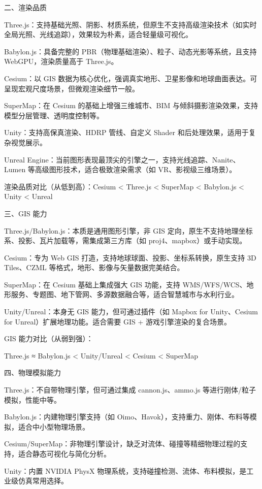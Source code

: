 二、渲染品质

Three.js：支持基础光照、阴影、材质系统，但原生不支持高级渲染技术（如实时全局光照、光线追踪），效果较为朴素，适合轻量级可视化。

Babylon.js：具备完整的 PBR（物理基础渲染）、粒子、动态光影等系统，且支持 WebGPU，渲染质量高于 Three.js。

Cesium：以 GIS 数据为核心优化，强调真实地形、卫星影像和地球曲面表达。可呈现宏观尺度场景，但微观渲染细节一般。

SuperMap：在 Cesium 的基础上增强三维城市、BIM 与倾斜摄影渲染效果，支持模型分层管理、透明度控制等。

Unity：支持高保真渲染、HDRP 管线、自定义 Shader 和后处理效果，适用于复杂视觉展示。

Unreal Engine：当前图形表现最顶尖的引擎之一，支持光线追踪、Nanite、Lumen 等高级图形技术，适合极致渲染需求（如 VR、影视级三维场景）。

渲染品质对比（从低到高）：Cesium \textless{} Three.js \textless{} SuperMap \textless{} Babylon.js \textless{} Unity \textless{} Unreal

三、GIS 能力

Three.js/Babylon.js：本质是通用图形引擎，非 GIS 定向，原生不支持地理坐标系、投影、瓦片加载等，需集成第三方库（如 proj4、mapbox）或手动实现。

Cesium：专为 Web GIS 打造，支持地球球面、投影、坐标系转换，原生支持 3D Tiles、CZML 等格式，地形、影像与矢量数据完美结合。

SuperMap：在 Cesium 基础上集成强大 GIS 功能，支持 WMS/WFS/WCS、地形服务、专题图、地下管网、多源数据融合等，适合智慧城市与水利行业。

Unity/Unreal：本身无 GIS 能力，但可通过插件（如 Mapbox for Unity、Cesium for Unreal）扩展地理功能。适合需要 GIS + 游戏引擎渲染的复合场景。

GIS 能力对比（从弱到强）：

Three.js ≈ Babylon.js \textless{} Unity/Unreal \textless{} Cesium \textless{} SuperMap

四、物理模拟能力

Three.js：不自带物理引擎，但可通过集成 cannon.js、ammo.js 等进行刚体/粒子模拟，性能中等。

Babylon.js：内建物理引擎支持（如 Oimo、Havok），支持重力、刚体、布料等模拟，适合中小型物理场景。

Cesium/SuperMap：非物理引擎设计，缺乏对流体、碰撞等精细物理过程的支持，适合静态可视化与简化分析。

Unity：内置 NVIDIA PhysX 物理系统，支持碰撞检测、流体、布料模拟，是工业级仿真常用选择。

